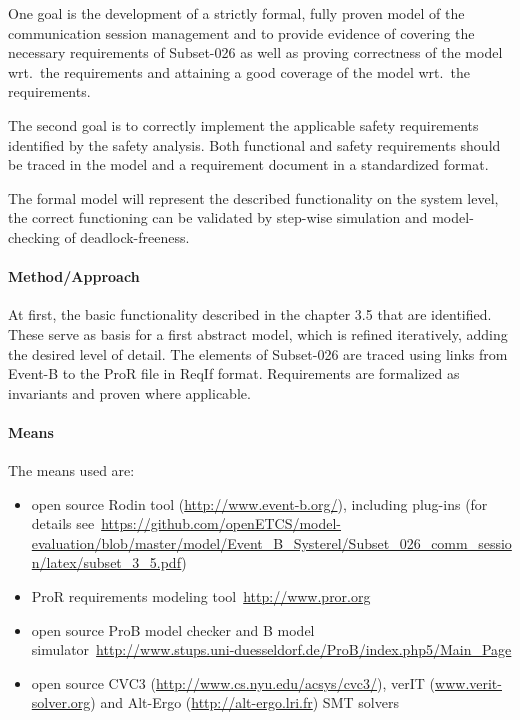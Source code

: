 One goal is the development of a strictly formal, fully proven model of the
communication session management and to provide evidence of covering the
necessary requirements of Subset-026 as well as proving correctness of the model
wrt.\ the requirements and attaining a good coverage of the model wrt.\ the
requirements.

The second goal is to correctly implement the applicable safety requirements
identified by the safety analysis. Both functional and safety requirements
should be traced in the model and a requirement document in a standardized
format.

The formal model will represent the described functionality on the system level,
the correct functioning can be validated by step-wise simulation and
model-checking of deadlock-freeness.


\paragraph{Method/Approach}
\label{sec:methodapproach}

At first, the basic functionality described in the chapter 3.5 that are
identified. These serve as basis for a first abstract model, which is refined
iteratively, adding the desired level of detail. The elements of Subset-026 are
traced using links from Event-B to the ProR file in ReqIf format. Requirements
are formalized as invariants and proven where applicable.

\paragraph{Means}
\label{sec:means}

The means used are:
\begin{itemize}
\item open source Rodin tool (\url{http://www.event-b.org/}), including plug-ins
  (for details
  see~\url{https://github.com/openETCS/model-evaluation/blob/master/model/Event_B_Systerel/Subset_026_comm_session/latex/subset_3_5.pdf})
\item ProR requirements modeling tool~\url{http://www.pror.org}
\item open source ProB model checker and B model
  simulator~\url{http://www.stups.uni-duesseldorf.de/ProB/index.php5/Main_Page}
\item open source CVC3 (\url{http://www.cs.nyu.edu/acsys/cvc3/}), verIT
  (\url{www.verit-solver.org}) and Alt-Ergo (\url{http://alt-ergo.lri.fr}) SMT
  solvers
\end{itemize}

